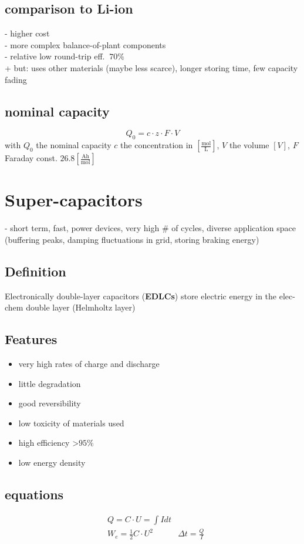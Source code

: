 \documentclass[a4paper,10pt,landscape]{scrartcl}
\begin{document}
\begin{multicols*}{3}
\subsection{comparison to Li-ion}
- higher cost \\
- more complex balance-of-plant components \\
- relative low round-trip eff. $~70\%$ \\
+ but: uses other materials (maybe less scarce), longer storing time, few capacity fading
\subsection{nominal capacity}
$$Q_0=c\cdot z\cdot F\cdot V$$
with $Q_0$ the nominal capacity $c$ the concentration in $\left[\mathrm{\frac{mol}{L}}\right]$, $V$ the volume $[V]$, $F$ Faraday const. $26.8\left[\mathrm{\frac{Ah}{mol}}\right]$

\section{Super-capacitors}
- short term, fast, power devices, very high \# of cycles, diverse application space (buffering peaks, damping fluctuations in grid, storing braking energy)
\subsection{Definition}
Electronically double-layer capacitors (\textbf{EDLCs}) store electric energy in the elec-chem double layer (Helmholtz layer)
\subsection{Features}
\begin{itemize}
    \item very high rates of charge and discharge
    \item little degradation
    \item good reversibility
    \item low toxicity of materials used
    \item high efficiency >$95\%$
    \item low energy density
\end{itemize}
\subsection{equations}
\begin{align*}
    &Q=C\cdot U=\int Idt & \\
    &W_e =\frac{1}{2}C\cdot U^2 &\Delta t=\frac{Q}{I}
\end{align*}


\end{multicols*}
\end{document}
